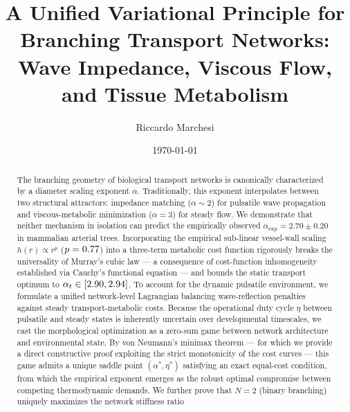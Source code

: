 \documentclass[11pt,a4paper]{article}
\theoremstyle{remark}
\begin{document}



\title{\LARGE\bfseries A Unified Variational Principle for Branching Transport Networks:\\[4pt]
Wave Impedance, Viscous Flow, and Tissue Metabolism}
\author{Riccardo Marchesi}
\date{\today}

\maketitle

\begin{abstract}
The branching geometry of biological transport networks is canonically
characterized by a diameter scaling exponent $\alpha$. Traditionally, this
exponent interpolates between two structural attractors: impedance matching
($\alpha \sim 2$) for pulsatile wave propagation and viscous-metabolic
minimization ($\alpha=3$) for steady flow. We demonstrate that neither
mechanism in isolation can predict the empirically observed
$\alpha_{\mathrm{exp}}=2.70 \pm 0.20$ in mammalian arterial trees. Incorporating
the empirical sub-linear vessel-wall scaling $h(r) \propto r^p$ ($p=0.77$) into a
three-term metabolic cost function rigorously breaks the universality of
Murray's cubic law --- a consequence of cost-function inhomogeneity established
via Cauchy's functional equation --- and bounds the static transport optimum to
$\alpha_t \in [2.90, 2.94]$. To account for the dynamic
pulsatile environment, we formulate a unified network-level Lagrangian
balancing wave-reflection penalties against steady transport-metabolic costs.
Because the operational duty cycle $\eta$ between pulsatile and steady states is
inherently uncertain over developmental timescales, we cast the morphological
optimization as a zero-sum game between network architecture and environmental
state. By von Neumann's minimax theorem --- for which we provide a direct
constructive proof exploiting the strict monotonicity of the cost curves ---
this game admits a unique saddle point $(\alpha^*, \eta^*)$ satisfying an exact
equal-cost condition, from which the empirical exponent emerges as the robust
optimal compromise between competing thermodynamic demands. We further prove
that $N=2$ (binary branching) uniquely maximizes the network stiffness ratio

\end{abstract}
\end{document}
